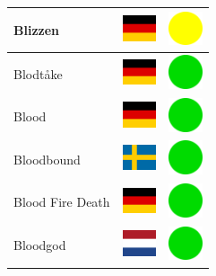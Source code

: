 \documentclass[12pt, a4paper, twoside]{report}
\begin{document}
\begin{center}
\begin{longtable}{|p{5cm}|p{2cm}|p{2cm}|}
Blizzen & \includegraphics[width=1cm]{4x3/de} & \includegraphics[width=1cm]{likes/m} \\ \hline
Blodtåke & \includegraphics[width=1cm]{4x3/de} & \includegraphics[width=1cm]{likes/y} \\ \hline
Blood & \includegraphics[width=1cm]{4x3/de} & \includegraphics[width=1cm]{likes/y} \\ \hline
Bloodbound & \includegraphics[width=1cm]{4x3/se} & \includegraphics[width=1cm]{likes/y} \\ \hline
Blood Fire Death & \includegraphics[width=1cm]{4x3/de} & \includegraphics[width=1cm]{likes/y} \\ \hline
Bloodgod & \includegraphics[width=1cm]{4x3/nl} & \includegraphics[width=1cm]{likes/y} \\ \hline

\end{longtable}
\end{center}
\end{document}
